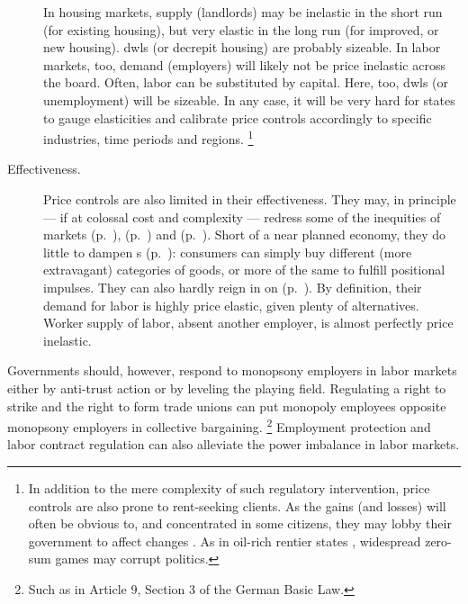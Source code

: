 \begin{description}
	In housing markets, supply (landlords) may be inelastic in the short run (for existing housing), but very elastic in the long run (for improved, or new housing).
	\glspl{dwl} (or decrepit housing) are probably sizeable.
	In labor markets, too, demand (employers) will likely not be price inelastic across the board.
	Often, labor can be substituted by capital.
	Here, too, \glspl{dwl} (or unemployment) will be sizeable.
	In any case, it will be very hard for states to gauge elasticities and calibrate price controls accordingly to specific industries, time periods and regions.
	\footnote{
		In addition to the mere complexity of such regulatory intervention, price controls are also prone to rent-seeking clients.
		As the gains (and losses) will often be obvious to, and concentrated in some citizens, they may lobby their government to affect changes \citep{Peltzman1976,Posner1975,Krueger1974}.
		As in oil-rich rentier states \citep{Beblawi1990}, widespread zero-sum games may corrupt politics.
	}

	\item[Effectiveness.]
	Price controls are also limited in their effectiveness.
	They may, in principle --- if at colossal cost and complexity --- redress some of the inequities of  markets (p.~\pageref{sec:winne-take-all}),  (p.~\pageref{sec:different-budget-constraints}) and  (p.~\pageref{sec:diminishing-marginal-utility}).
	Short of a near planned economy, they do little to dampen s (p.~\pageref{sec:positional-race}):
	 consumers can simply buy different (more extravagant) categories of goods, or more of the same to fulfill positional impulses.
	They can also hardly reign in on  (p.~\pageref{sec:monopsony-employers}).
	By definition, their demand for labor is highly price elastic, given plenty of alternatives.
	Worker supply of labor, absent another employer, is almost perfectly price inelastic.
\end{description}

Governments should, however, respond to monopsony employers in labor markets either by anti-trust action or by leveling the playing field.
Regulating a right to strike and the right to form trade unions can put monopoly employees opposite monopsony employers in collective bargaining.
\footnote{
	Such as in Article 9, Section 3 of the German Basic Law.
}
Employment protection and labor contract regulation can also alleviate the power imbalance in labor markets.

